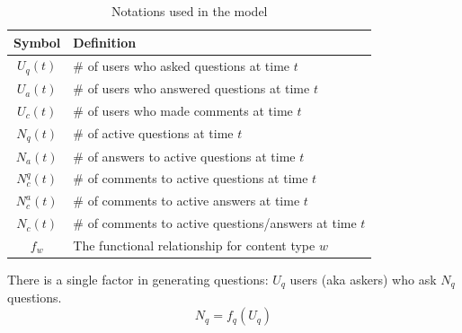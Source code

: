 \begin{table}[thb]
	\vspace{-0.5\baselineskip}
	\caption{Notations used in the model}
    \vspace{-\baselineskip}
    \label{tab:notations}
	\begin{center}    
	\begin{tabular}{cl}
	\toprule Symbol & Definition\\ \midrule
	$U_q(t)$ & \# of users who asked questions at time $t$\\ 
	$U_a(t)$ & \# of users who answered questions at time $t$\\
	$U_c(t)$ & \# of users who made comments at time $t$\\
	$N_q(t)$ & \# of active questions at time $t$\\
	$N_a(t)$ & \# of answers to active questions at time $t$\\
	$N_c^q(t)$ & \# of comments to active questions at time $t$\\
	$N_c^a(t)$ & \# of comments to active answers at time $t$\\
    $N_c(t)$ & \# of comments to active questions/answers at time $t$\\
	$f_w$ & The functional relationship for content type $w$\\ \bottomrule
	\end{tabular}
    \end{center}
    \vspace{-\baselineskip}   
\end{table}

There is a single factor in generating questions: $U_q$ users (aka askers) who ask $N_q$ questions.
\begin{equation*}
N_q = f_q(U_q)
\end{equation*}

